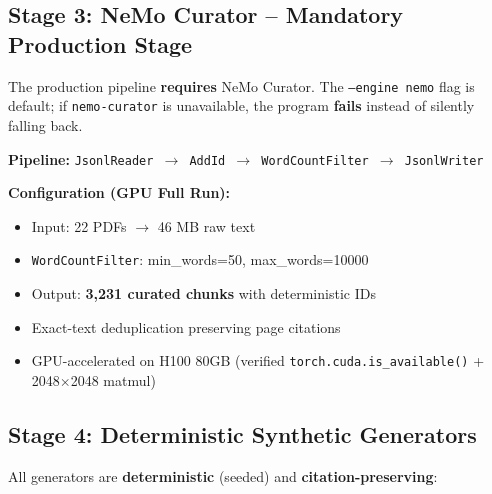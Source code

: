 \documentclass[11pt,a4paper]{article}
\begin{document}
\subsection{Stage 3: NeMo Curator -- Mandatory Production Stage}
\begin{nvidiabox}
The production pipeline \textbf{requires} NeMo Curator. The \texttt{--engine nemo} flag is default; if \texttt{nemo-curator} is unavailable, the program \textbf{fails} instead of silently falling back.

\medskip
\noindent\textbf{Pipeline:} \texttt{JsonlReader $\to$ AddId $\to$ WordCountFilter $\to$ JsonlWriter}

\medskip
\noindent\textbf{Configuration (GPU Full Run):}
\begin{itemize}[label=\textcolor{nvidiaGreen}{$\bullet$}, leftmargin=*]
    \item Input: 22 PDFs $\to$ 46 MB raw text
    \item \texttt{WordCountFilter}: min\_words=50, max\_words=10000
    \item Output: \textbf{3,231 curated chunks} with deterministic IDs
    \item Exact-text deduplication preserving page citations
    \item GPU-accelerated on H100 80GB (verified \texttt{torch.cuda.is\_available()} + 2048$\times$2048 matmul)
\end{itemize}
\end{nvidiabox}

\subsection{Stage 4: Deterministic Synthetic Generators}
All generators are \textbf{deterministic} (seeded) and \textbf{citation-preserving}:
\end{document}
